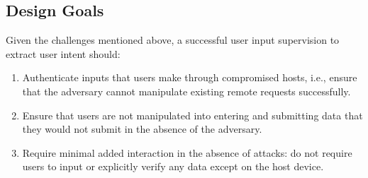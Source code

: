 \subsection{Design Goals}
\label{sec:systemDesign:designgolaks}

 Given the challenges mentioned above, a successful user input supervision to extract user intent should:

\begin{enumerate}
	\item Authenticate inputs that users make through compromised hosts, i.e., ensure that the adversary cannot manipulate existing remote requests successfully.

	\item Ensure that users are not manipulated into entering and submitting data that they would not submit in the absence of the adversary.

	\item Require minimal added interaction in the absence of attacks: do not require users to input or explicitly verify any data except on the host device.
\end{enumerate}